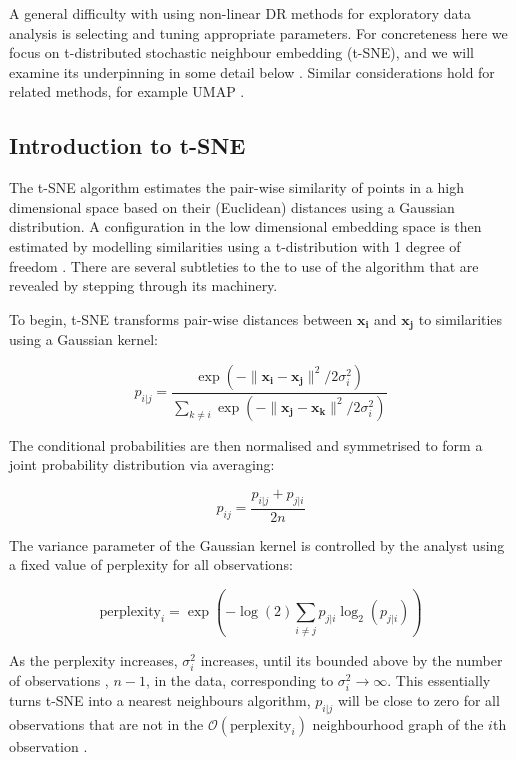 \documentclass[article,notitle]{jdssv}
\begin{document}
A general difficulty with using
non-linear DR methods for exploratory data analysis is selecting and tuning
appropriate parameters. For concreteness here we focus on t-distributed
stochastic neighbour embedding (t-SNE), and we will examine
its underpinning in some detail below \citep{Maaten2008-sk}. Similar considerations hold for related
methods, for example UMAP \citep{McInnes2018-co}.

\hypertarget{introduction-to-t-sne}{%
\subsection{Introduction to t-SNE}\label{introduction-to-t-sne}}

The t-SNE algorithm estimates the pair-wise similarity of points in a high
dimensional space based on their (Euclidean) distances using a Gaussian
distribution. A configuration in the low dimensional embedding space is then
estimated by modelling similarities using a t-distribution with 1 degree of
freedom \citep{Maaten2008-sk}. There are several subtleties
to the to use of the algorithm that are revealed by stepping through its
machinery.

To begin, t-SNE transforms pair-wise distances between \(\mathbf{x_i}\) and
\(\mathbf{x_j}\) to similarities using a Gaussian kernel:

\[ 
p_{i|j} = \frac{\exp(-\lVert \mathbf{x_i - x_j} \rVert ^ 2 /
2\sigma_i^2)}{\sum_{k \ne i}\exp(-\lVert \mathbf{x_j - x_k} \rVert ^ 2 /
2\sigma_i^2)} 
\]

The conditional probabilities are then normalised and symmetrised to form a
joint probability distribution via averaging:

\[ p_{ij} = \frac{p_{i|j} + p_{j|i}}{2n} \]

The variance parameter of the Gaussian kernel is controlled by the analyst
using a fixed value of perplexity for all observations:

\[ \text{perplexity}_i = \exp(-\log(2) \sum_{i \ne j}p_{j|i}\log_2(p_{j|i})) \]

As the perplexity increases, \(\sigma^2_{i}\) increases, until its bounded above
by the number of observations , \(n-1\), in the data, corresponding to
\(\sigma^2_{i} \rightarrow \infty\). This essentially turns t-SNE into a
nearest neighbours algorithm, \(p_{i|j}\) will be close to zero for all
observations that are not in the \(\mathcal{O}(\text{perplexity}_i)\)
neighbourhood graph of the \(i\)th observation \citep{Van_Der_Maaten2014-zn}.
\end{document}
